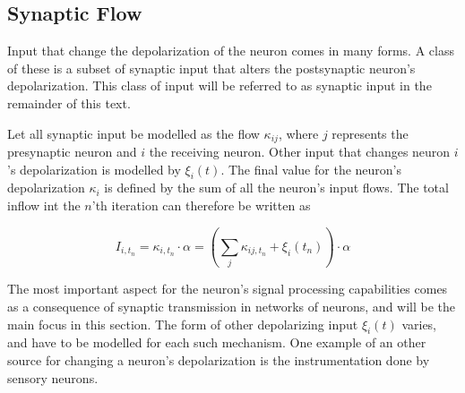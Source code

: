 

    \subsection{Synaptic Flow}
	\label{ssecSynapticFlow}
	Input that change the depolarization of the neuron comes in many forms. 
	A class of these is a subset of synaptic input that alters the postsynaptic neuron's depolarization.
	This class of input will be referred to as synaptic input in the remainder of this text.

	Let all synaptic input be modelled as the flow $\kappa_{ij}$, where $j$ represents the presynaptic neuron and $i$ the receiving neuron.
	Other input that changes neuron $i$'s depolarization is modelled by $\xi_i(t)$.
	The final value for the neuron's depolarization $\kappa_i$ is defined by the sum of all the neuron's input flows.
	The total inflow int the $n$'th iteration can therefore be written as

		\begin{equation}
			I_{i, t_n} = \kappa_{i,t_n} \cdot \alpha = \left( \sum_{j} \kappa_{ij, t_n} + \xi_i(t_n) \right) \cdot \alpha
			\label{eqSynapticIntegrationForKANN}
		\end{equation}

	The most important aspect for the neuron's signal processing capabilities comes as a consequence of synaptic transmission in networks of neurons, and will be the main focus in this section.
	The form of other depolarizing input $\xi_i(t)$ varies, and have to be modelled for each such mechanism. %
	One example of an other source for changing a neuron's depolarization is the instrumentation done by sensory neurons. %


